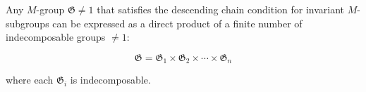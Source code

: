 Any $M$-group $\mathfrak{G} \neq 1$ that satisfies the descending chain condition for invariant $M$-subgroups can be expressed as a direct product of a finite number of indecomposable groups $\neq 1$:

$$\mathfrak{G} = \mathfrak{G}_1 \times \mathfrak{G}_2 \times \cdots \times \mathfrak{G}_n$$

where each $\mathfrak{G}_i$ is indecomposable.
